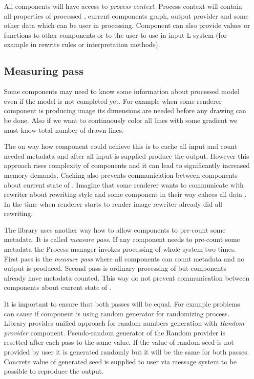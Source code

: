 All components will have access to \emph{process context}.
Process context will contain all properties of processed \lsystem, current components graph, output provider and some other data which can be user in processing.
Component can also provide values or functions to other components or to the user to use in input L-system (for example in rewrite rules or interpretation methods).  


\subsection{Measuring pass}
\label{sec:measuring}

Some components may need to know some information about processed model even if the model is not completed yet.
For example when some renderer component is producing image its dimensions are needed before any drawing can be done.
Also if we want to continuously color all lines with some gradient we must know total number of drawn lines.

The on way how component could achieve this is to cache all input and count needed metadata and after all input is supplied produce the output.
However this approach rises complexity of components and it can lead to significantly increased memory demands.
Caching also prevents communication between components about current state of \lsystem.
Imagine that some renderer wants to communicate with rewriter about rewriting style and some component in their way cahces all data .
In the time when renderer starts to render image rewriter already did all rewriting.

The library uses another way how to allow components to pre-count some metadata.
It is called \emph{measure pass}.
If any component needs to pre-count some metadata the Process manager invokes processing of whole system two times.
First pass is the \emph{measure pass} where all components can count metadata and no output is produced.
Second pass is ordinary processing of \lsystem but components already have metadata counted.
This way do not prevent communication between components about current state of \lsystem.

It is important to ensure that both passes will be equal.
For example problems can cause if component is using random generator for randomizing process.
Library provides unified approach for random numbers generation with \emph{Random provider} component.
Pseudo-random generator of the Random provider is resetted after each pass to the same value.
If the value of random seed is not provided by user it is generated randomly but it will be the same for both passes.
Concrete value of generated seed is supplied to user via message system to be possible to reproduce the output.

